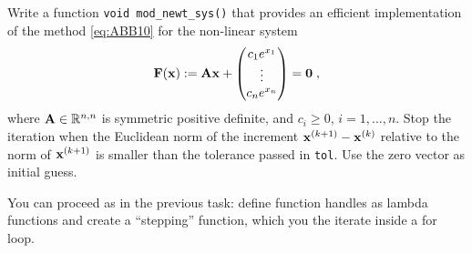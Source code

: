 \begin{problem}
\begin{subproblem}[2]
\begin{solution}
% 
\end{solution}
\end{subproblem}

\begin{subproblem}[4] \label{subprb:ModifiedNewton_4}
Write a \Cpp{} function \verb|void mod_newt_sys()|
that provides an efficient implementation of the method \eqref{eq:ABB10} for the non-linear system
\begin{equation*}
  {\mathbf{F}}({\mathbf{x}}) := {\mathbf{A}}{\mathbf{x}} +  \begin{pmatrix}   c_{1}e^{x_{1}} \\   \vdots  \\    c_{n}e^{x_{n}} \end{pmatrix} = {\mathbf{0}} \;,
\end{equation*}
where ${\mathbf{A}}\in\mathbb{R}^{n,n}$ is symmetric positive definite, and $c_{i}\ge0$,
$i=1,\ldots,n$. Stop the iteration when the Euclidean norm of the increment
${\mathbf{x}}^{(k+1)}-{\mathbf{x}}^{(k)}$ relative to the norm of ${\mathbf{x}}^{(k+1)}$ is smaller than the
tolerance passed in \texttt{tol}.
Use the zero vector as initial guess.

\begin{hint}
 You can proceed as in the previous task: define function handles as lambda functions and create a ``stepping'' function, which you the iterate inside a for loop.
\end{hint}


\end{subproblem}
\end{problem}
